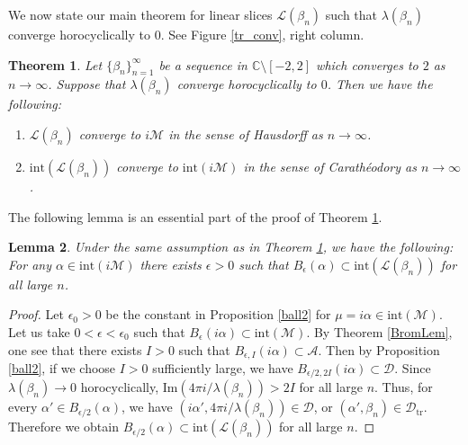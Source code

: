 \documentclass[12pt]{article}
\theoremstyle{plain}
\newtheorem{thm}{Theorem}[section]
\newtheorem{lem}[thm]{Lemma}
\theoremstyle{definition}
\theoremstyle{remark}
\newcommand{\C}{\mathbb C}
\newcommand{\D}{\mathcal D}
\newcommand{\M}{\mathcal M}
\newcommand{\LL}{\mathcal L}
\newcommand{\A}{\mathcal A}
\newcommand{\lam}{\lambda}
\newcommand{\alp}{\alpha}
\newcommand{\fty}{\infty}
\newcommand{\ep}{\epsilon}
\newcommand{\sm}{\setminus}
\newcommand{\tr}{{\mathrm{tr}}}
\newcommand{\inte}{\mathrm{int}}
\newcommand{\im}{\mathrm{Im}}
\begin{document}
We now state our main theorem for linear slices $\LL(\beta_n)$  
such that $\lam(\beta_n)$ converge horocyclically to $0$. 
See Figure \ref{tr_conv}, right column. 

\begin{thm}\label{horo}
Let $\{\beta_n\}_{n=1}^\fty$ be a sequence in $\C \sm [-2,2]$ which converges to $2$ as $n \to \fty$. 
Suppose that $\lam(\beta_n)$ converge horocyclically to $0$.  
Then we have the following: 
\begin{enumerate}
\item $\LL(\beta_n)$ converge to $i\M$ in the sense of Hausdorff as $n \to \fty$. 
\item $\inte(\LL(\beta_n))$ converge to $\inte(i \M)$ in the sense of Carath\'{e}odory as $n \to \fty$. 
\end{enumerate}
\end{thm}

The following lemma is an essential part of the proof of Theorem \ref{horo}. 

\begin{lem}\label{horolem}
Under the same assumption as in Theorem \ref{horo}, we have the following: 
For any $\alp \in \inte(i \M)$ there exists $\ep>0$ such that 
$B_\ep(\alp) \subset  \inte(\LL(\beta_n))$
for all large $n$. 
\end{lem}

\begin{proof} 
Let $\ep_0>0$ be the constant in Proposition \ref{ball2} for $\mu=i\alp \in\inte(\M)$. 
Let us take $0<\ep<\ep_0$ such that $B_\ep(i\alp) \subset \inte(\M)$. 
By Theorem \ref{BromLem}, one see that  there exists  $I>0$ such that $B_{\ep,I}(i\alp) \subset \A$. 
Then by Proposition \ref{ball2}, 
if we choose $I>0$ sufficiently large,  we have 
$B_{\ep/2,2I}(i \alpha) \subset \D$. 
Since $\lam(\beta_n) \to 0$ horocyclically, $\im(4\pi i/\lam(\beta_n))>2I$ for all large $n$. 
Thus, for every $\alp' \in B_{\ep/2}(\alp)$,  we have $(i\alp', 4\pi i/\lam(\beta_n)) \in \D$, 
or $(\alp', \beta_n) \in \D_\tr$. 
Therefore we obtain 
$B_{\ep/2}(\alp) \subset  \inte(\LL(\beta_n))$ for all large $n$. 
\end{proof}
\end{document}
